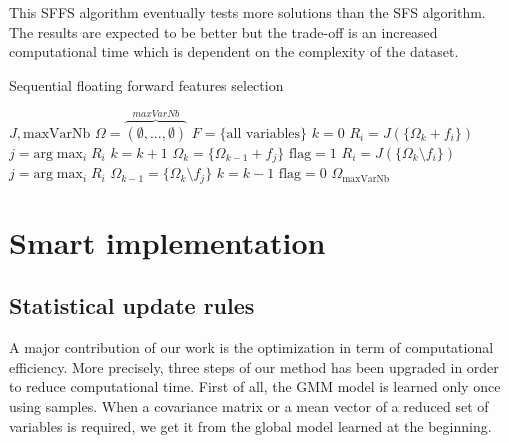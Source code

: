 \documentclass[a4paper,11pt,DIV=16,abstracton]{scrartcl}
\begin{document}
            This SFFS algorithm eventually tests more solutions than the SFS algorithm. The results are expected to be better but the trade-off is an increased computational time which is dependent on the complexity of the dataset.

            \begin{algorithm}
            \caption{Sequential floating forward features selection\label{alg:sffs}}
            {\fontsize{10}{10}\selectfont
            \begin{algorithmic}[1]
            \REQUIRE $J,\text{maxVarNb}$
            \STATE $\Omega=\overbrace{(\emptyset,...,\emptyset)}^{maxVarNb}$
            \STATE $F=\text{\{all variables\}}$
            \STATE $k=0$
            \STATE $R_i = J(\{\Omega_k + f_i\})$
            \ENDFOR
            \STATE $j=\text{arg} \max_{i} R_i$
            \STATE $k=k+1$
            \STATE $\Omega_k = \{\Omega_{k-1} + f_j\}$
            \STATE $\text{flag}=1$
            \STATE $R_i = J(\{\Omega_k \setminus f_i\})$
            \ENDFOR
            \STATE $j=\text{arg} \max_{i} R_i$
            \STATE $\Omega_{k-1} = \{\Omega_k \setminus f_j\}$
            \STATE $k=k-1$
            \ELSE
            \STATE $\text{flag}=0$
            \ENDIF
            \ENDWHILE
            \ENDIF
            \ENDWHILE
            \RETURN $\Omega_{\text{maxVarNb}}$
            \end{algorithmic}
            }
            \end{algorithm}

\section{Smart implementation}
\label{sec:implementation}

    \subsection{Statistical update rules}
    A major contribution of our work is the optimization in term of computational efficiency. More precisely, three steps of our method has been upgraded in order to reduce computational time. First of all, the GMM model is learned only once using samples. When a covariance matrix or a mean vector of a reduced set of variables is required, we get it from the global model learned at the beginning.
\end{document}
